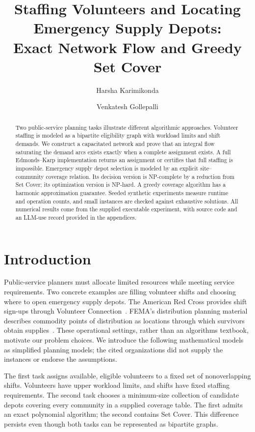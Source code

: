 \documentclass[sigconf,nonacm]{acmart}
\title{Staffing Volunteers and Locating Emergency Supply Depots:\\
Exact Network Flow and Greedy Set Cover}
\author{Harsha Karimikonda}
\affiliation{\institution{University of Florida}\country{USA}}
\author{Venkatesh Gollepalli}
\affiliation{\institution{University of Florida}\country{USA}}
\begin{document}
\begin{abstract}
Two public-service planning tasks illustrate different algorithmic approaches.
Volunteer staffing is modeled as a bipartite eligibility graph with workload
limits and shift demands. We construct a capacitated network and prove that
an integral flow saturating the demand arcs exists exactly when a complete
assignment exists. A full Edmonds--Karp implementation returns an assignment
or certifies that full staffing is impossible. Emergency supply depot selection
is modeled by an explicit site--community coverage relation. Its decision
version is NP-complete by a reduction from Set Cover; its optimization version
is NP-hard. A greedy coverage algorithm has a harmonic approximation guarantee.
Seeded synthetic experiments measure runtime and operation counts, and small
instances are checked against exhaustive solutions. All numerical results
come from the supplied executable experiment, with source code and an LLM-use
record provided in the appendices.
\end{abstract}
\maketitle

\section{Introduction}
Public-service planners must allocate limited resources while meeting service
requirements. Two concrete examples are filling volunteer shifts and choosing
where to open emergency supply depots. The American Red Cross provides shift
sign-ups through Volunteer Connection~\cite{redcross}. FEMA's distribution
planning material describes commodity points of distribution as locations
through which survivors obtain supplies~\cite{fema}. These operational settings,
rather than an algorithms textbook, motivate our problem choices. We introduce
the following mathematical models as simplified planning models; the cited
organizations did not supply the instances or endorse the assumptions.

The first task assigns available, eligible volunteers to a fixed set of
nonoverlapping shifts. Volunteers have upper workload limits, and shifts have
fixed staffing requirements. The second task chooses a minimum-size collection
of candidate depots covering every community in a supplied coverage table.
The first admits an exact polynomial algorithm; the second contains Set Cover.
This difference persists even though both tasks can be represented as
bipartite graphs.
\end{document}
